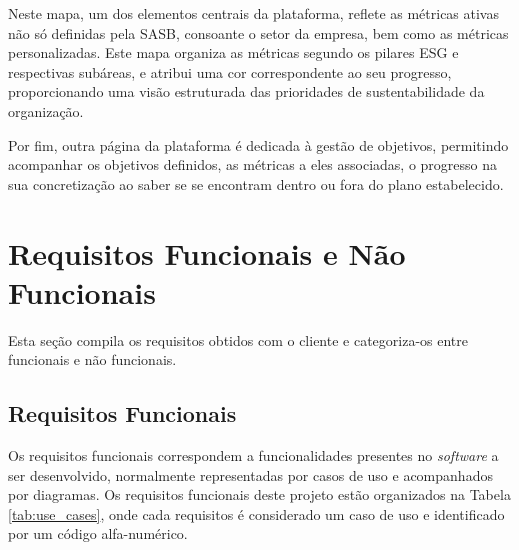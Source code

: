 Neste mapa, um dos elementos centrais da plataforma, reflete as métricas ativas não só definidas pela \gls{SASB}, consoante o setor da empresa, bem como as métricas personalizadas. Este mapa organiza as métricas segundo os pilares ESG e respectivas subáreas, e atribui uma cor correspondente ao seu progresso, proporcionando uma visão estruturada das prioridades de sustentabilidade da organização.

Por fim, outra página da plataforma é dedicada à gestão de objetivos, permitindo acompanhar os objetivos definidos, as métricas a eles associadas, o progresso na sua concretização ao saber se se encontram dentro ou fora do plano estabelecido.

\section{Requisitos Funcionais e Não Funcionais}

Esta seção compila os requisitos obtidos com o cliente e categoriza-os entre funcionais e não funcionais.

\subsection{Requisitos Funcionais}
\label{subsec:FunReq}

Os requisitos funcionais correspondem a funcionalidades presentes no \textit{software} a ser desenvolvido, normalmente representadas por casos de uso e acompanhados por diagramas. Os requisitos funcionais deste projeto estão organizados na Tabela \ref{tab:use_cases}, onde cada requisitos é considerado um caso de uso e identificado por um código alfa-numérico.

